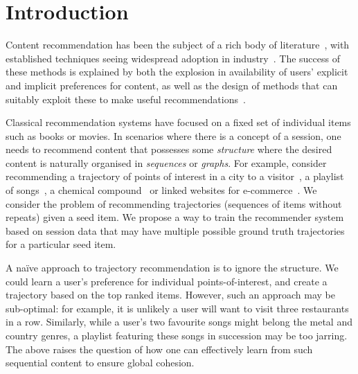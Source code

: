 
\section{Introduction}
\label{sec:intro}

Content recommendation has been the subject of a rich body of literature~\citep{Goldberg:1992,Sarwar:2001,Koren:2010},
with established techniques seeing widespread adoption in industry~\citep{Linden:2003,Agarwal:2013,Amatriain:2015,Gomez-Uribe:2015}.
The success of these methods is explained by both the explosion in availability of users' explicit and implicit preferences for content,
as well as the design of methods that can suitably exploit these to make useful recommendations~\citep{Koren:2009}.

Classical recommendation systems have focused on a fixed set of individual items such as books or movies. In scenarios where there is a concept of a session,
one needs to recommend content that possesses some \emph{structure}
where the desired content is naturally organised in
\emph{sequences} or {\em graphs}.
For example, consider %
recommending a trajectory of points of interest in a city to a visitor~\citep{lu2010photo2trip,lu2012personalized,ijcai15,cikm16paper},
a playlist of songs~\citep{McFee:2011,chen2012playlist,hidasi2015session,choi2016towards},
a chemical compound~\cite{dehaspe1998finding} or linked websites for e-commerce~\cite{antikacioglu2015recommendation}.
We consider the problem of recommending trajectories (sequences of items
without repeats) given a seed item.
We propose a way to train the recommender system based on session data that may
have multiple possible ground truth trajectories for a particular seed item.

A na\"{i}ve approach to trajectory recommendation is to ignore the structure.
We could learn a user's preference for individual points-of-interest,
and create a trajectory based on the top ranked items.
However, such an approach may be sub-optimal:
for example,
it is unlikely a user will want to visit three restaurants in a row.
Similarly,
while a user's two favourite songs might belong
the metal and country genres,
a playlist featuring these songs in succession may be too jarring.
The above raises the question of how one can effectively learn from such sequential content to ensure global cohesion.

